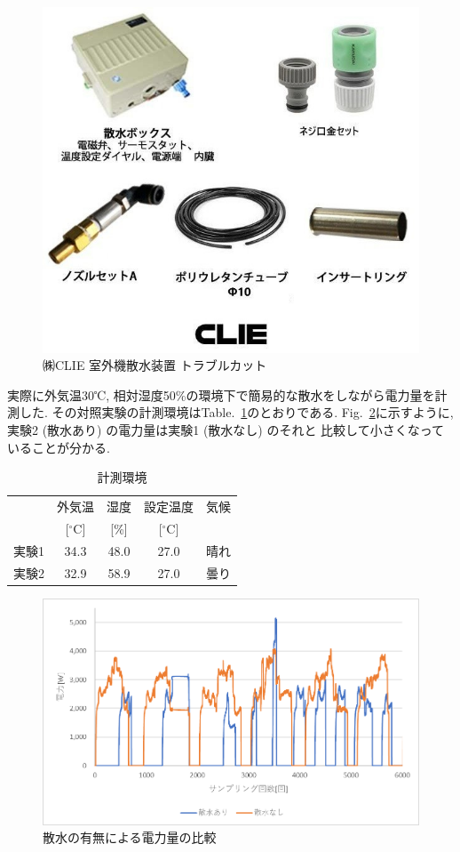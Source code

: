 \documentclass[a4j,fleqn,dvipdfmx,uplatex]{jsarticle}
\newcommand{\figref}[1]{Fig.\ \ref{#1}}
\newcommand{\tableref}[1]{Table.\ \ref{#1}}
\begin{document}
\begin{figure}[htb]
  \centering
  \includegraphics[width=0.8\linewidth]{img/trubleCut.jpg}
  \caption{㈱CLIE 室外機散水装置 トラブルカット\cite{clie}}
  \label{fig:truble_cut}
\end{figure}

実際に外気温30℃, 相対湿度50\%の環境下で簡易的な散水をしながら電力量を計測した. 
その対照実験の計測環境は\tableref{table:ex1}のとおりである. 
\figref{fig1:compare_watering}に示すように, 実験2 (散水あり) の電力量は実験1 (散水なし) のそれと
比較して小さくなっていることが分かる.

\begin{table}[htb]
  \caption{計測環境}
  \label{table:ex1}
  \centering
  \begin{tabular}{lcccc}
     & 外気温 & 湿度 & 設定温度 & 気候 \\[-1.5mm]
     & [$^\circ$C] & [\%] & [$^\circ$C] &  \\
    \hline \hline
    実験1 & 34.3 & 48.0 & 27.0 & 晴れ  \\
    実験2 & 32.9 & 58.9 & 27.0 & 曇り \\
    \hline
  \end{tabular}
\end{table}

\begin{figure}[htb]
  \centering
      \includegraphics[width=0.8\linewidth]{img/ex1.png}
      \caption{散水の有無による電力量の比較}
      \label{fig1:compare_watering}
\end{figure}
\end{document}
